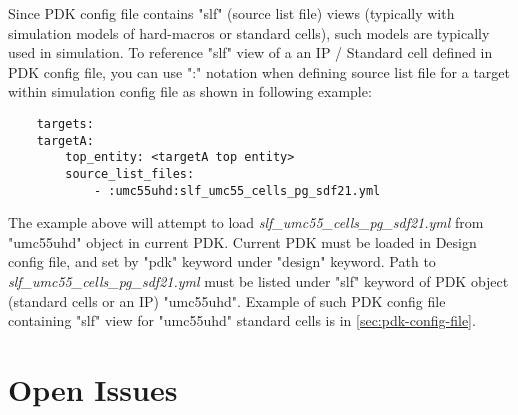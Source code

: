 \documentclass{tropic_design_spec}
\begin{document}
Since PDK config file contains "slf" (source list file) views (typically with
simulation models of hard-macros or standard cells), such models are typically
used in simulation. To reference "slf" view of a an IP / Standard cell defined in
PDK config file, you can use ":" notation when defining source list file for a target
within simulation config file as shown in following example:

\begin{lstlisting}
    targets:
    targetA:
        top_entity: <targetA top entity>
        source_list_files:
            - :umc55uhd:slf_umc55_cells_pg_sdf21.yml

\end{lstlisting}

The example above will attempt to load \textit{slf_umc55_cells_pg_sdf21.yml} from "umc55uhd"
object in current PDK. Current PDK must be loaded in Design config file, and set by
"pdk" keyword under "design" keyword. Path to \textit{slf_umc55_cells_pg_sdf21.yml} must be
listed under "slf" keyword of PDK object (standard cells or an IP) "umc55uhd".
Example of such PDK config file containing "slf" view for "umc55uhd" standard cells
is in \ref{sec:pdk-config-file}.




\pagebreak
\section{Open Issues}

\PrintOpenIssueSummary
\end{document}
